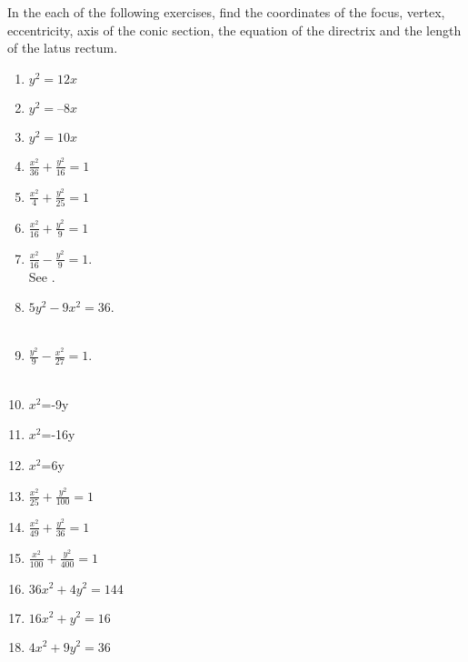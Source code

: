 In the each of the following exercises, find the coordinates of the focus, vertex, eccentricity, axis of the conic section, the equation of the directrix and the length of the latus rectum.
\begin{enumerate}[label=\thesubsection.\arabic*,ref=\thesubsection.\theenumi]
\item $y^2=12x$ 
\label{chapters/11/11/2/1}
\\
\solution
%
\item 
$y^2 = –8x$
\\
\solution
\item $y^2=10x$  
  \item $\frac{x^2}{36}+\frac{y^2}{16}=1$
\\
\solution
%
  \item $\frac{x^2}{4}+\frac{y^2}{25}=1$
\\
\solution
%
  \item $\frac{x^2}{16}+\frac{y^2}{9}=1$
\\
\solution
%
	\item $\frac{x^2}{16}-\frac{y^2}{9} = 1$. \\ 
		\solution
See .
\begin{table}[!ht]
\centering
\caption{}
\label{tab:std-conic-params-sol}
\resizebox{\columnwidth}{!}{%
		
		}
\end{table}
	\item $5{y^2}-9{x^2}=36$.
		\\
		\solution
		\\
	\item $\frac{y^2}{9}-\frac{x^2}{27}=1$.
		\\
		\solution
		\\
\item $x^2$=-9y  
\item $x^2$=-16y
\\
\solution
\item $x^2$=6y 
\\
\solution
  \item $\frac{x^2}{25}+\frac{y^2}{100}=1$
  \item $\frac{x^2}{49}+\frac{y^2}{36}=1$
  \item $\frac{x^2}{100}+\frac{y^2}{400}=1$
  \item $36x^2+4y^2=144$
  \item $16x^2+y^2=16$
  \item $4x^2+9y^2=36$
\end{enumerate}


